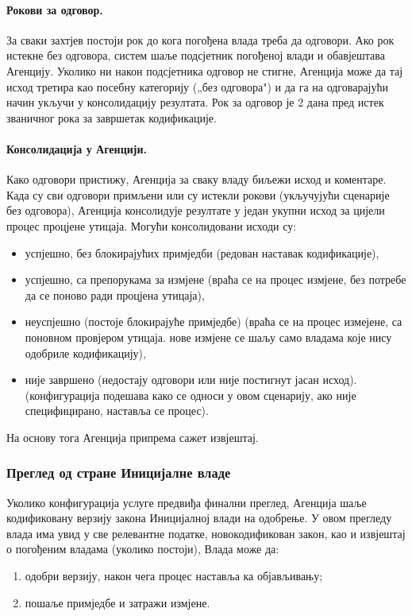 \documentclass[12pt,a4paper]{article}
\begin{document}
\paragraph{Рокови за одговор.}

За сваки захтјев постоји рок до кога погођена влада треба да одговори. Ако рок истекне без одговора, систем шаље подсјетник погођеној влади и обавјештава Агенцију. Уколико ни након подсјетника одговор не стигне, Агенција може да тај исход третира као посебну категорију („без одговора") и да га на одговарајући начин укључи у консолидацију резултата. Рок за одговор је 2 дана пред истек званичног рока за завршетак кодификације.

\paragraph{Консолидација у Агенцији.}

Како одговори пристижу, Агенција за сваку владу биљежи исход и коментаре. Када су сви одговори примљени или су истекли рокови (укључујући сценарије без одговора), Агенција консолидује резултате у један укупни исход за цијели процес процјене утицаја. Могући консолидовани исходи су:
\begin{itemize}
    \item успјешно, без блокирајућих примједби (редован наставак кодификације),
    \item успјешно, са препорукама за измјене (враћа се на процес измјене, без потребе да се поново ради процјена утицаја),
    \item неуспјешно (постоје блокирајуће примједбе) (враћа се на процес измејене, са поновном провјером утицаја. нове измјене се шаљу само владама које нису одобриле кодификацију),
    \item није завршено (недостају одговори или није постигнут јасан исход). (конфигурација подешава како се односи у овом сценарију, ако није специфицирано, наставља се процес).
\end{itemize}
На основу тога Агенција припрема сажет извјештај.

\subsubsection{Преглед од стране Иницијалне владе}

Уколико конфигурација услуге предвиђа финални преглед, Агенција шаље кодификовану верзију закона Иницијалној влади на одобрење. У овом прегледу влада има увид у све релевантне податке, новокодификован закон, као и извјештај о погођеним владама (уколико постоји), Влада може да:
\begin{enumerate}[label=\alph*)]
    \item одобри верзију, након чега процес наставља ка објављивању;
    \item пошаље примједбе и затражи измјене.
\end{enumerate}
\end{document}

